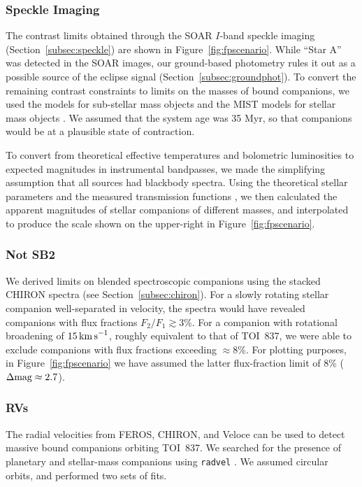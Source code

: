 \documentclass[12pt,twocolumn,tighten]{aastex63}
\newcommand{\tn}{TOI~837} %
\begin{document}
\subsubsection{Speckle Imaging}
The contrast limits obtained through the SOAR $I$-band speckle imaging
(Section~\ref{subsec:speckle}) are shown in
Figure~\ref{fig:fpscenario}.  While ``Star A'' was detected in the
SOAR images, our ground-based photometry rules it out as a possible
source of the eclipse signal (Section~\ref{subsec:groundphot}).  To
convert the remaining contrast constraints to limits on the masses of
bound companions, we used the \citet{baraffe_evolutionary_2003} models
for sub-stellar mass objects and the MIST models for stellar mass
objects
\citep{paxton_modules_2011,paxton_modules_2013,paxton_modules_2015,dotter_mesa_2016,choi_mesa_2016}.
We assumed that the system age was 35 Myr, so that companions would be
at a plausible state of contraction.

To convert from theoretical effective temperatures and bolometric
luminosities to expected magnitudes in instrumental bandpasses, we
made the simplifying assumption that all sources had blackbody
spectra.  Using the theoretical stellar parameters and the measured
transmission functions \citep{tokovinin_ten_2018}, we then calculated
the apparent magnitudes of stellar companions of different masses, and
interpolated to produce the scale shown on the upper-right in
Figure~\ref{fig:fpscenario}.

\subsubsection{Not SB2}
We derived limits on blended spectroscopic companions using the
stacked CHIRON spectra (see Section~\ref{subsec:chiron}).  For a
slowly rotating stellar companion well-separated in velocity, the
spectra would have revealed companions with flux fractions $F_2/F_1
\gtrsim 3\%$.  For a companion with rotational broadening of $15\,{\rm
km\,s}^{-1}$, roughly equivalent to that of \tn, we were able to
exclude companions with flux fractions exceeding $\approx$8\%.  For
plotting purposes, in Figure~\ref{fig:fpscenario} we have assumed the
latter flux-fraction limit of 8\% ($\Delta {\rm mag} \approx 2.7$).


\subsubsection{RVs}
The radial velocities from FEROS, CHIRON, and Veloce can be used to
detect massive bound companions orbiting \tn.  We searched for the
presence of planetary and stellar-mass companions using
\texttt{radvel} \citep{fulton_radvel_2018}.  We assumed circular
orbits, and performed two sets of fits.
\end{document}
